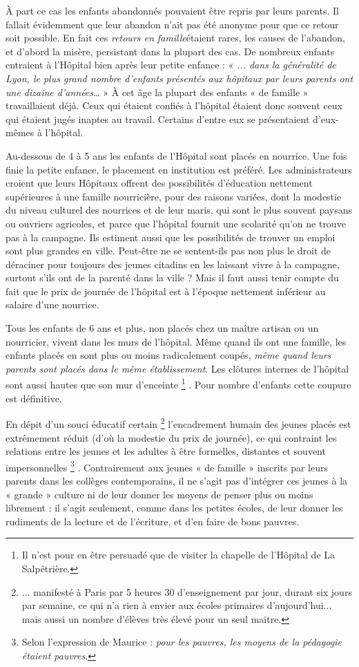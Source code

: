  À part ce cas les enfants abandonnés pouvaient être repris par leurs parents. Il fallait évidemment que leur abandon n'ait pas été anonyme pour que ce retour soit possible. En fait ces \emph{retours en famille}étaient rares, les causes de l'abandon, et d'abord la misère, persistant dans la plupart des cas.
 De nombreux enfants entraient à l'Hôpital bien après leur petite enfance : « \emph{... dans la généralité de Lyon, le plus grand nombre d'enfants présentés aux hôpitaux par leurs parents ont une dizaine d'années…} » À cet âge la plupart des enfants « de famille » travaillaient déjà. Ceux qui étaient confiés à l'hôpital étaient donc souvent ceux qui étaient jugés inaptes au travail. Certains d'entre eux se présentaient d'eux-mêmes à l'hôpital. 

 Au-dessous de 4 à 5 ans les enfants de l'Hôpital sont placés en nourrice. Une fois finie la petite enfance, le placement en institution est préféré. Les administrateurs croient que leurs Hôpitaux offrent des possibilités d'éducation nettement supérieures à une famille nourricière, pour des raisons variées, dont la modestie du niveau culturel des nourrices et de leur maris, qui sont le plus souvent paysans ou ouvriers agricoles, et parce que l'hôpital fournit une scolarité qu'on ne trouve pas à la campagne. Ils estiment aussi que les possibilités de trouver un emploi sont plus grandes en ville. Peut-être ne se sentent-ils pas non plus le droit de déraciner pour toujours des jeunes citadins en les laissant vivre à la campagne, surtout s'ils ont de la parenté dans la ville ? Mais il faut aussi tenir compte du fait que le prix de journée de l'hôpital est à l'époque nettement inférieur au salaire d'une nourrice.

 Tous les enfants de 6 ans et plus, non placés chez un maître artisan ou un nourricier, vivent dans les murs de l'hôpital. Même quand ils ont une famille, les enfants placés en sont plus ou moins radicalement coupés, \emph{même quand leurs parents sont placés dans le même établissement}. Les clôtures internes de l'hôpital sont aussi hautes que son mur d'enceinte%
\footnote{Il n'est pour en être persuadé que de visiter la chapelle de l'Hôpital de La Salpêtrière.} 
. Pour nombre d'enfants cette coupure est définitive. 

 En dépit d'un souci éducatif certain%
\footnote{... manifesté à Paris par 5 heures 30 d'enseignement par jour, durant six jours par semaine, ce qui n'a rien à envier aux écoles primaires d'aujourd'hui... mais aussi un nombre d'élèves très élevé pour un seul maitre.} 
l'encadrement humain des jeunes placés est extrêmement réduit (d'où la modestie du prix de journée), ce qui contraint les relations entre les jeunes et les adultes à être formelles, distantes et souvent impersonnelles%
\footnote{Selon l'expression de Maurice  : \emph{pour les pauvres, les moyens de la pédagogie étaient pauvres}.}%
. Contrairement aux jeunes « de famille » inscrits par leurs parents dans les collèges contemporains, il ne s'agit pas d'intégrer ces jeunes à la « grande » culture ni de leur donner les moyens de penser plus ou moins librement : il s'agit seulement, comme dans les petites écoles, de leur donner les rudiments de la lecture et de l'écriture, et d'en faire de bons pauvres.

